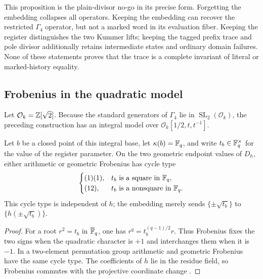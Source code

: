 This proposition is the plain-divisor no-go in its precise form.  Forgetting the
embedding collapses all operators.  Keeping the embedding can recover the
restricted \(\Gamma_4\) operator, but not a marked word in its evaluation fiber.
Keeping the register distinguishes the two Kummer lifts; keeping the tagged
prefix trace and pole divisor additionally retains intermediate states and
ordinary domain failures.  None of these statements proves that the trace is a
complete invariant of literal or marked-history equality.

\subsection{Frobenius in the quadratic model}
\label{subsec:quadratic-register-frobenius}

Let \(\mathcal O_k=\mathbb{Z}[\sqrt2]\).  Because the standard generators of
\(\Gamma_4\) lie in \(\operatorname{SL}_2(\mathcal O_k)\), the preceding
construction has an integral model over
\(\mathcal O_k[1/2,t,t^{-1}]\).

\begin{proposition}
\label{prop:quadratic-register-frobenius}
Let \(b\) be a closed point of this integral base, let
\(\kappa(b)=\mathbb{F}_q\), and write \(t_b\in\mathbb{F}_q^\times\) for the value of the
register parameter.  On the two geometric endpoint values of \(D_h\), either
arithmetic or geometric Frobenius has cycle type
\begin{equation}
 \begin{cases}
 (1)(1),&t_b\text{ is a square in }\mathbb{F}_q,\\
 (12),&t_b\text{ is a nonsquare in }\mathbb{F}_q.
 \end{cases}
 \label{eq:quadratic-frobenius-cycle}
\end{equation}
This cycle type is independent of \(h\); the embedding merely sends
\(\{\pm\sqrt{t_b}\}\) to \(\{h(\pm\sqrt{t_b})\}\).
\end{proposition}

\begin{proof}
For a root \(r^2=t_b\) in \(\overline{\mathbb{F}}_q\), one has
\(r^q=t_b^{(q-1)/2}r\).  Thus Frobenius fixes the two signs when the quadratic
character is \(+1\) and interchanges them when it is \(-1\).  In a two-element
permutation group arithmetic and geometric Frobenius have the same cycle type.
The coefficients of \(h\) lie in the residue field, so Frobenius commutes with
the projective coordinate change \cite{Neukirch1999AlgebraicNumberTheory}.
\end{proof}

